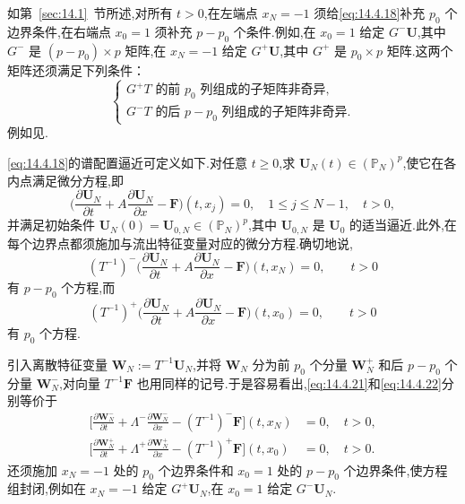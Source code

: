 如第~\ref{sec:14.1}~节所述,对所有 \(t>0\),在左端点 \(x_N=-1\) 须给\eqref{eq:14.4.18}补充 \(p_0\) 个边界条件,在右端点 \(x_0=1\) 须补充 \(p-p_0\) 个条件.例如,在 \(x_0=1\) 给定 \(G^-\boldsymbol{U}\),其中 \(G^-\) 是 \((p-p_0)\times p\) 矩阵,在 \(x_N=-1\) 给定 \(G^+\boldsymbol{U}\),其中 \(G^+\) 是 \(p_0\times p\) 矩阵.这两个矩阵还须满足下列条件：
\[
  \begin{cases}
    \text{\(G^+T\) 的前 \(p_0\) 列组成的子矩阵非奇异},\\
    \text{\(G^-T\) 的后 \(p-p_0\) 列组成的子矩阵非奇异}.
  \end{cases}
\]
例如见.

\eqref{eq:14.4.18}的谱配置逼近可定义如下.对任意 \(t\ge0\),求 \(\boldsymbol{U}_N(t)\in(\mathbb P_N)^p\),使它在各内点满足微分方程,即
\begin{equation}\label{eq:14.4.20}
  \biggl(\frac{\partial\boldsymbol{U}_N}{\partial t}
        +A\frac{\partial\boldsymbol{U}_N}{\partial x}-\boldsymbol{F}\biggr)(t,x_j)=0,
       \quad 1\le j\le N-1,\quad t>0,
\end{equation}
并满足初始条件 \(\boldsymbol{U}_N(0)=\boldsymbol{U}_{0,N}\in(\mathbb P_N)^p\),其中 \(\boldsymbol{U}_{0,N}\) 是 \(\boldsymbol{U}_0\) 的适当逼近.此外,在每个边界点都须施加与流出特征变量对应的微分方程.确切地说,
\begin{equation}\label{eq:14.4.21}
  (T^{-1})^-\biggl(\frac{\partial\boldsymbol{U}_N}{\partial t}
        +A\frac{\partial\boldsymbol{U}_N}{\partial x}-\boldsymbol{F}\biggr)(t,x_N)=0,
        \qquad t>0
\end{equation}
有 \(p-p_0\) 个方程,而
\begin{equation}\label{eq:14.4.22}
  (T^{-1})^+\biggl(\frac{\partial\boldsymbol{U}_N}{\partial t}
        +A\frac{\partial\boldsymbol{U}_N}{\partial x}-\boldsymbol{F}\biggr)(t,x_0)=0,
        \qquad t>0
\end{equation}
有 \(p_0\) 个方程.

引入离散特征变量 \(\boldsymbol{W}_N:=T^{-1}\boldsymbol{U}_N\),并将 \(\boldsymbol{W}_N\) 分为前 \(p_0\) 个分量 \(\boldsymbol{W}_N^+\) 和后 \(p-p_0\) 个分量 \(\boldsymbol{W}_N^-\),对向量 \(T^{-1}\boldsymbol{F}\) 也用同样的记号.于是容易看出,\eqref{eq:14.4.21}和\eqref{eq:14.4.22}分别等价于
\begin{align}
  \biggl[\frac{\partial\boldsymbol{W}_N^-}{\partial t}
        +\Lambda^-\frac{\partial\boldsymbol{W}_N^-}{\partial x}
        -(T^{-1})^-\boldsymbol{F}\biggr](t,x_N)&=0,\quad t>0,\label{eq:14.4.23}\\
  \biggl[\frac{\partial\boldsymbol{W}_N^+}{\partial t}
        +\Lambda^+\frac{\partial\boldsymbol{W}_N^+}{\partial x}
        -(T^{-1})^+\boldsymbol{F}\biggr](t,x_0)&=0,\quad t>0.\label{eq:14.4.24}
\end{align}
还须施加 \(x_N=-1\) 处的 \(p_0\) 个边界条件和 \(x_0=1\) 处的 \(p-p_0\) 个边界条件,使方程组封闭,例如在 \(x_N=-1\) 给定 \(G^+\boldsymbol{U}_N\),在 \(x_0=1\) 给定 \(G^-\boldsymbol{U}_N\).

